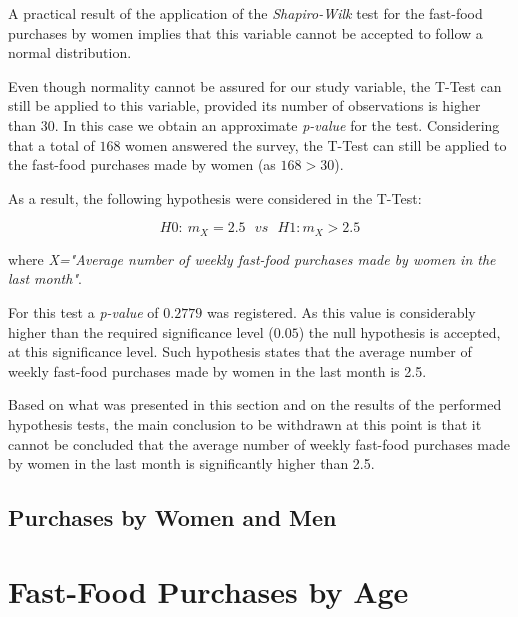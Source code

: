 \documentclass[12pt]{article}
\begin{document}
A practical result of the application of the \emph{Shapiro-Wilk} test for the fast-food purchases by women implies that this variable cannot be accepted to follow a normal distribution.

Even though normality cannot be assured for our study variable, the T-Test  can still be applied to this variable, provided its number of observations is higher than $30$. In this case we obtain an approximate \emph{p-value} for the test. Considering that a total of $168$ women answered the survey, the T-Test can still be applied to the fast-food purchases made by women (as $168 > 30$).

As a result, the following hypothesis were considered in the T-Test:

$$ H0: \: m_{X} = 2.5 \: \: \: vs \: \: \: H1: m_{X} > 2.5$$

where \emph{X="Average number of weekly fast-food purchases made by women in the last month"}.

For this test a \emph{p-value} of $0.2779$ was registered. As this value is considerably higher than the required significance level ($0.05$) the null hypothesis is accepted, at this significance level. Such hypothesis states that the average number of weekly fast-food purchases made by women in the last month is 2.5.

Based on what was presented in this section and on the results of the performed hypothesis tests, the main conclusion to be withdrawn at this point is that it cannot be concluded that the average number of weekly fast-food purchases made by women in the last month is significantly higher than 2.5.

\subsection{Purchases by Women and Men}



\section{Fast-Food Purchases by Age}
\label{age_tests}
\end{document}
